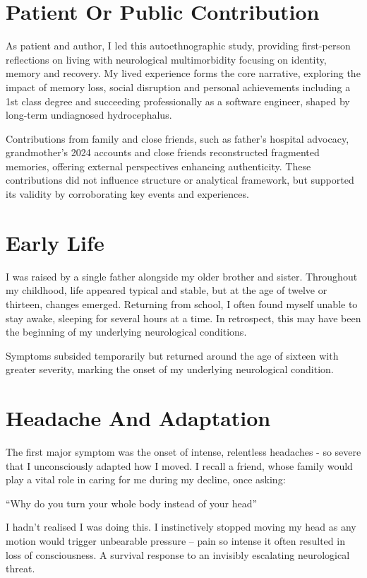 \documentclass{article}
\begin{document}
\section*{Patient Or Public Contribution}
As patient and author, I led this autoethnographic study, providing first-person reflections on living with neurological multimorbidity focusing on identity, memory and recovery. My lived experience forms the core narrative, exploring the impact of memory loss, social disruption and personal achievements including a 1st class degree and succeeding professionally as a software engineer, shaped by long-term undiagnosed hydrocephalus.

Contributions from family and close friends, such as father’s hospital advocacy, grandmother's 2024 accounts and close friends reconstructed fragmented memories, offering external perspectives enhancing authenticity. These contributions did not influence structure or analytical framework, but supported its validity by corroborating key events and experiences.

\section*{Early Life}
I was raised by a single father alongside my older brother and sister. Throughout my childhood, life appeared typical and stable, but at the age of twelve or thirteen, changes emerged. Returning from school, I often found myself unable to stay awake, sleeping for several hours at a time. In retrospect, this may have been the beginning of my underlying neurological conditions.

Symptoms subsided temporarily but returned around the age of sixteen with greater severity, marking the onset of my underlying neurological condition.

\section*{Headache And Adaptation}
The first major symptom was the onset of intense, relentless headaches - so severe that I unconsciously adapted how I moved. I recall a friend, whose family would play a vital role in caring for me during my decline, once asking:
\begin{center}
“Why do you turn your whole body instead of your head”
\end{center}

I hadn’t realised I was doing this. I instinctively stopped moving my head as any motion would trigger unbearable pressure – pain so intense it often resulted in loss of consciousness. A survival response to an invisibly escalating neurological threat.
\end{document}
